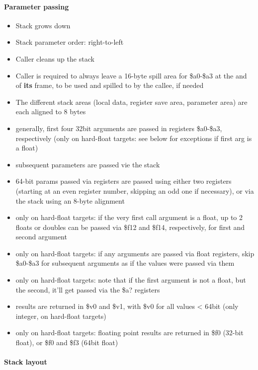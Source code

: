 \paragraph{Parameter passing}

\begin{itemize}
\item Stack grows down
\item Stack parameter order: right-to-left
\item Caller cleans up the stack
\item Caller is required to always leave a 16-byte spill area for \$a0-\$a3 at the and of {\bf its} frame, to be used and spilled to by the callee, if needed
\item The different stack areas (local data, register save area, parameter area) are each aligned to 8 bytes
\item generally, first four 32bit arguments are passed in registers \$a0-\$a3, respectively (only on hard-float targets: see below for exceptions if first arg is a float)
\item subsequent parameters are passed vie the stack
\item 64-bit params passed via registers are passed using either two registers (starting at an even register number, skipping an odd one if necessary), or via the stack using an 8-byte alignment
\item only on hard-float targets: if the very first call argument is a float, up to 2 floats or doubles can be passed via \$f12 and \$f14, respectively, for first and second argument
\item only on hard-float targets: if any arguments are passed via float registers, skip \$a0-\$a3 for subsequent arguments as if the values were passed via them
\item only on hard-float targets: note that if the first argument is not a float, but the second, it'll get passed via the \$a? registers
\item results are returned in \$v0 and \$v1, with \$v0 for all values < 64bit (only integer, on hard-float targets)
\item only on hard-float targets: floating point results are returned in \$f0 (32-bit float), or \$f0 and \$f3 (64bit float)
\end{itemize}

\paragraph{Stack layout}

